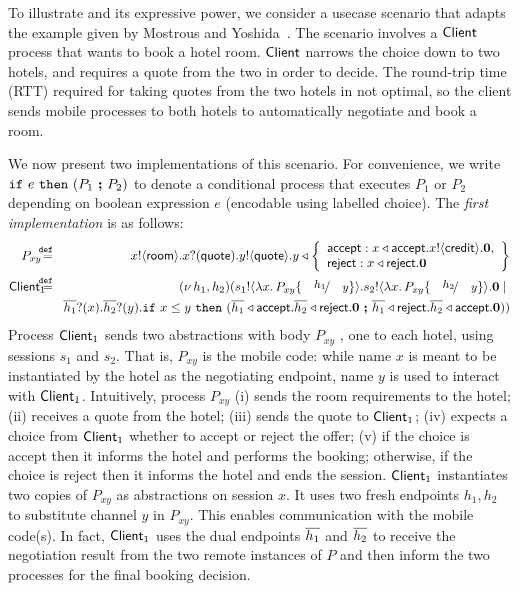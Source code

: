 \begin{example}\label{exam:proc}
To illustrate \HOp and its expressive power, 
we consider a usecase scenario that adapts the example given by Mostrous and Yoshida~\cite{tlca07,MostrousY15}.
The scenario involves a $\mathsf{Client}$ process that wants to book
a hotel room. %
$\mathsf{Client}$
narrows the choice down to two hotels, and requires 
 a quote from the two in order to
decide. The round-trip time (RTT) required for
taking quotes from the two hotels in not optimal, %
so the client sends mobile processes to both hotels
to automatically negotiate and book a room. 

We now present two \HOp implementations of this scenario.
For convenience, we write $\mathtt{if}\  e\ \mathtt{then}\  (P_1\ \boldsymbol{;} \ P_2)$ 
to denote a conditional process that executes $P_1$ or $P_2$ depending on boolean expression $e$ (encodable using labelled choice).
The \emph{first implementation} is  as follows:
%
	\begin{eqnarray*}%
		 P_{xy}  \!\!\! & \defeq &  \!\!\! \bout{x}{\rtype} \binp{x}{\Quote} \bout{y}{\Quote}
		y \triangleleft \left\{
				\begin{array}{l}
					\accept: \bsel{x}{\accept} \bout{x}{\creditc} \inact,\\
					\reject: \bsel{x}{\reject} \inact
				\end{array}
				\right\}
		\\ %
		 \Client_1 \!\!\!\!\! & \defeq  &  \!\!\! \newsp{h_1, h_2}{\bout{s_1}{\abs{x}{P_{xy} \subst{h_1}{y}}} \bout{s_2}{\abs{x}{P_{xy} \subst{h_2}{y}}} \inact \Par  \\
		& & 
		\!\!\! \binp{\dual{h_1}}{x} \binp{\dual{h_2}}{y}  \If x \leq y\   \Then (\bsel{\dual{h_1}}{\accept} \bsel{\dual{h_2}}{\reject} \inact \ \Else \ \bsel{\dual{h_1}}{\reject} \bsel{\dual{h_2}}{\accept} \inact )
		}
	\end{eqnarray*}
%
Process $\mathsf{Client}_1$ sends two abstractions with body $P_{xy}$ , one to each hotel, 
		using sessions $s_1$ and $s_2$.
		That is, $P_{xy}$ is the mobile code:
	while
		name $x$ is meant to be instantiated by the hotel as the negotiating
		endpoint, name $y$ is used to interact with $\mathsf{Client}_1$.	
		Intuitively, process $P_{xy}$ (i)  sends the room requirements to the hotel;
		(ii) receives a quote from the hotel;
		(iii) sends the quote to  $\mathsf{Client}_1$;
		(iv) expects a choice from   $\mathsf{Client}_1$ whether to accept or reject the offer;
		(v) if the choice is accept then it informs the hotel and performs the booking;
		otherwise, if the choice is reject then it informs the hotel and ends the session.
				$\mathsf{Client}_1$ instantiates two copies of  $P_{xy}$ as abstractions
		on session $x$. It uses two
		fresh endpoints $h_1, h_2$ to substitute channel $y$
		in $P_{xy}$. This enables communication with the mobile code(s).
		In fact, 
		$\mathsf{Client}_1$ uses the dual endpoints $\overline{h_1}$ and $\overline{h_2}$
		to receive the negotiation
		result from the two remote instances of $P$ and then inform the two
		processes for the final booking decision.


\end{example}
